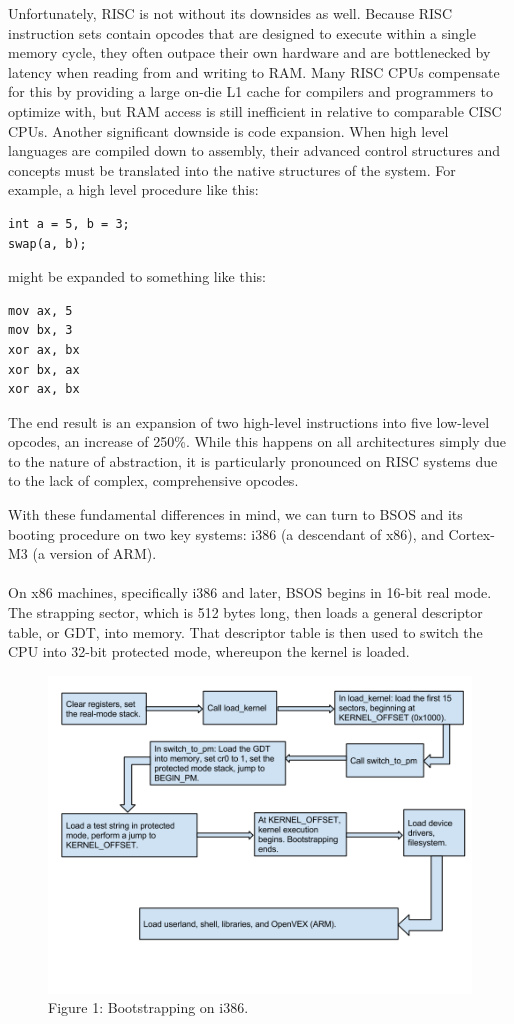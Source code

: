 \documentclass[english]{paper}
\begin{document}
Unfortunately, RISC is not without its downsides as well. Because RISC instruction sets contain opcodes that are designed to execute within a single memory cycle, they often outpace their own hardware and are bottlenecked by latency when reading from and writing to RAM. Many RISC CPUs compensate for this by providing a large on-die L1 cache for compilers and programmers to optimize with, but RAM access is still inefficient in relative to comparable CISC CPUs. Another significant downside is code expansion. When high level languages are compiled down to assembly, their advanced control structures and concepts must be translated into the native structures of the system. For example, a high level procedure like this:
\begin{lstlisting}
int a = 5, b = 3;
swap(a, b);
\end{lstlisting}
might be expanded to something like this:
\begin{lstlisting}
mov ax, 5
mov bx, 3
xor ax, bx
xor bx, ax
xor ax, bx
\end{lstlisting}
The end result is an expansion of two high-level instructions into five low-level opcodes, an increase of 250\%. While this happens on all architectures simply due to the nature of abstraction, it is particularly pronounced on RISC systems due to the lack of complex, comprehensive opcodes.

With these fundamental differences in mind, we can turn to BSOS and its booting procedure on two key systems: i386 (a descendant of x86), and Cortex-M3 (a version of ARM).

\paragraph{}
On x86 machines, specifically i386 and later, BSOS begins in 16-bit real mode. The strapping sector, which is 512 bytes long, then loads a general descriptor table, or GDT, into memory. That descriptor table is then used to switch the CPU into 32-bit protected mode, whereupon the kernel is loaded.
\begin{figure}[h!]
\centerline{\includegraphics[scale=0.4]{imgs/boot_x86.png}}
\caption{Figure 1: Bootstrapping on i386.}
\end{figure}
\end{document}
